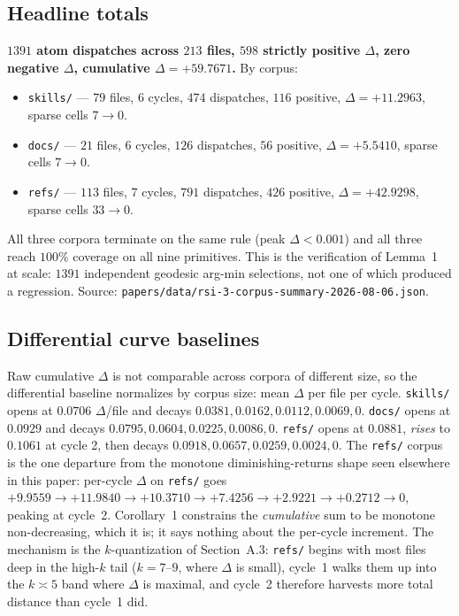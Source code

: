 \documentclass[11pt,a4paper]{article}
\theoremstyle{plain}
\theoremstyle{remark}
\theoremstyle{plain}
\begin{document}
\subsection{Headline totals}

\textbf{$1391$ atom dispatches across $213$ files, $598$ strictly positive $\Delta$, zero negative $\Delta$, cumulative $\Delta = +59.7671$.} By corpus:
\begin{itemize}
\item \texttt{skills/} --- $79$ files, $6$ cycles, $474$ dispatches, $116$ positive, $\Delta = +11.2963$, sparse cells $7 \to 0$.
\item \texttt{docs/} --- $21$ files, $6$ cycles, $126$ dispatches, $56$ positive, $\Delta = +5.5410$, sparse cells $7 \to 0$.
\item \texttt{refs/} --- $113$ files, $7$ cycles, $791$ dispatches, $426$ positive, $\Delta = +42.9298$, sparse cells $33 \to 0$.
\end{itemize}
All three corpora terminate on the same rule (peak $\Delta < 0.001$) and all three reach $100\%$ coverage on all nine primitives. This is the verification of Lemma~1 at scale: $1391$ independent geodesic arg-min selections, not one of which produced a regression. Source: \texttt{papers/data/rsi-3-corpus-summary-2026-08-06.json}.

\subsection{Differential curve baselines}

Raw cumulative $\Delta$ is not comparable across corpora of different size, so the differential baseline normalizes by corpus size: mean $\Delta$ per file per cycle. \texttt{skills/} opens at $0.0706$ $\Delta$/file and decays $0.0381, 0.0162, 0.0112, 0.0069, 0$. \texttt{docs/} opens at $0.0929$ and decays $0.0795, 0.0604, 0.0225, 0.0086, 0$. \texttt{refs/} opens at $0.0881$, \emph{rises} to $0.1061$ at cycle 2, then decays $0.0918, 0.0657, 0.0259, 0.0024, 0$. The \texttt{refs/} corpus is the one departure from the monotone diminishing-returns shape seen elsewhere in this paper: per-cycle $\Delta$ on \texttt{refs/} goes $+9.9559 \to +11.9840 \to +10.3710 \to +7.4256 \to +2.9221 \to +0.2712 \to 0$, peaking at cycle~2. Corollary~1 constrains the \emph{cumulative} sum to be monotone non-decreasing, which it is; it says nothing about the per-cycle increment. The mechanism is the $k$-quantization of Section~A.3: \texttt{refs/} begins with most files deep in the high-$k$ tail ($k = 7$--$9$, where $\Delta$ is small), cycle~1 walks them up into the $k \asymp 5$ band where $\Delta$ is maximal, and cycle~2 therefore harvests more total distance than cycle~1 did.
\end{document}
